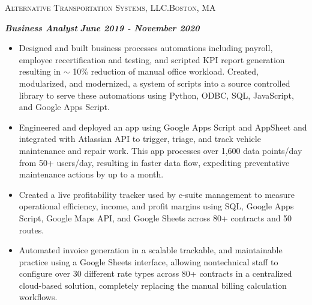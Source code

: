\documentclass[a4paper]{article}
\newcommand{\jobtitle} [1] {
    {\hspace*{-18pt} \textsc{#1}}
    
}
\begin{document}
\jobtitle{Alternative Transportation Systems, LLC.\hfill Boston, MA}
\hspace*{-16pt}\textit{\textbf{Business Analyst}} \hfill \textbf{\textit{June 2019 - November 2020}}\\
\vspace{-1mm}
\begin{itemize}[leftmargin=10pt,align=left] \itemsep 1pt
	\item Designed and built business processes automations including payroll, employee recertification and testing, and scripted KPI report generation resulting in $\sim$ 10\% reduction of manual office workload. 
    Created, modularized, and modernized, a system of scripts into a source controlled library to serve these automations using Python, ODBC, SQL, JavaScript, and Google Apps Script.
	\item Engineered and deployed an app using Google Apps Script and AppSheet and integrated with Atlassian API to trigger, triage, and track vehicle maintenance and repair work. This app processes over 1,600 data points/day from 50+ users/day, resulting in faster data flow, expediting preventative maintenance actions by up to a month.
	\item Created a live profitability tracker used by c-suite management to measure operational efficiency, income, and profit margins using SQL, Google Apps Script, Google Maps API, and Google Sheets across 80+ contracts and 50 routes.
	\item Automated invoice generation in a scalable trackable, and maintainable practice using a Google Sheets interface, allowing nontechnical staff to configure over 30 different rate types across 80+ contracts in a centralized cloud-based solution, completely replacing the manual billing calculation workflows.
\end{itemize}
\end{document}
